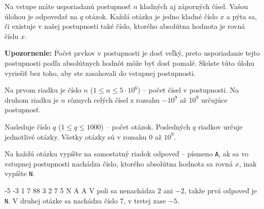 




Na vstupe máte usporiadanú postupnosť $n$ kladných aj záporných čísel. Vašou úlohou je odpovedať na
$q$ otázok. Každá otázka je jedno kladné číslo $x$ a pýta sa, či existuje v našej postupnosti také
číslo, ktorého absolútna hodnota je rovná číslu $x$.

\textbf{Upozornenie:} Počet prvkov v postupnosti je dosť veľký, preto usporiadanie tejto postupnosti
podľa absolútnych hodnôt môže byť dosť pomalé. Skúste túto úlohu vyriešiť bez toho, aby ste
zasahovali do vstupnej postupnosti.


Na prvom riadku je číslo $n$ ($1 \leq n \leq 5\cdot 10^6$) -- počet čísel v postupnosti.
Na druhom riadku je $n$ rôznych celých čísel z rozsahu $-10^9$ až $10^9$ určujúce postupnosť.

Nasleduje číslo $q$ ($1 \leq q \leq 1000$) -- počet otázok. Posledných $q$ riadkov určuje jednotlivé
otázky. Všetky otázky sú v rozsahu $0$ až $10^9$.


Na každú otázku vypíšte na samostatný riadok odpoveď -- písmeno \texttt{A}, ak sa vo vstupnej
postupnosti nachádza číslo, ktorého absolútna hodnota sa rovná $x$, inak vypíšte \texttt{N}. 


-5 -3 1 7 88
3
2
7
5
\vystup
N
A
A
\komentar
V poli sa nenachádza $2$ ani $-2$, takže prvá odpoveď je \texttt{N}. V druhej otázke sa nachádza
číslo $7$, v tretej zase $-5$.
\koniec


